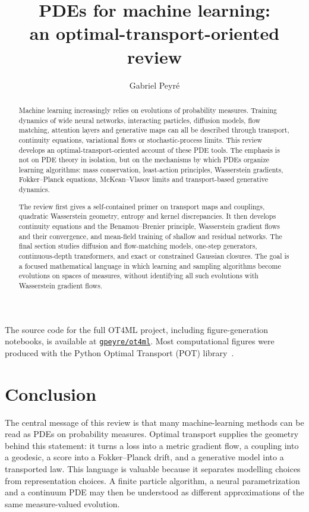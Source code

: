 \documentclass{acta-numerica}
\title{PDEs for machine learning:\\an optimal-transport-oriented review}
\author{Gabriel Peyr{\'e}}
\affiliation{CNRS and DMA, \'Ecole normale sup\'erieure, PSL University, Paris, France}
\begin{document}
\maketitle
\begin{abstract}
Machine learning increasingly relies on evolutions of probability measures. Training dynamics of wide neural networks, interacting particles, diffusion models, flow matching, attention layers and generative maps can all be described through transport, continuity equations, variational flows or stochastic-process limits. This review develops an optimal-transport-oriented account of these PDE tools. The emphasis is not on PDE theory in isolation, but on the mechanisms by which PDEs organize learning algorithms: mass conservation, least-action principles, Wasserstein gradients, Fokker--Planck equations, McKean--Vlasov limits and transport-based generative dynamics.

The review first gives a self-contained primer on transport maps and couplings, quadratic Wasserstein geometry, entropy and kernel discrepancies. It then develops continuity equations and the Benamou--Brenier principle, Wasserstein gradient flows and their convergence, and mean-field training of shallow and residual networks. The final section studies diffusion and flow-matching models, one-step generators, continuous-depth transformers, and exact or constrained Gaussian closures. The goal is a focused mathematical language in which learning and sampling algorithms become evolutions on spaces of measures, without identifying all such evolutions with Wasserstein gradient flows.
\end{abstract}

\noindent The source code for the full OT4ML project, including figure-generation notebooks, is available at \href{https://github.com/gpeyre/ot4ml}{\texttt{gpeyre/ot4ml}}. Most computational figures were produced with the Python Optimal Transport (POT) library~\citep{flamary2021pot}.

\tableofcontents






\section*{Conclusion}
The central message of this review is that many machine-learning methods can be read as PDEs on probability measures. Optimal transport supplies the geometry behind this statement: it turns a loss into a metric gradient flow, a coupling into a geodesic, a score into a Fokker--Planck drift, and a generative model into a transported law. This language is valuable because it separates modelling choices from representation choices. A finite particle algorithm, a neural parametrization and a continuum PDE may then be understood as different approximations of the same measure-valued evolution.
\end{document}
